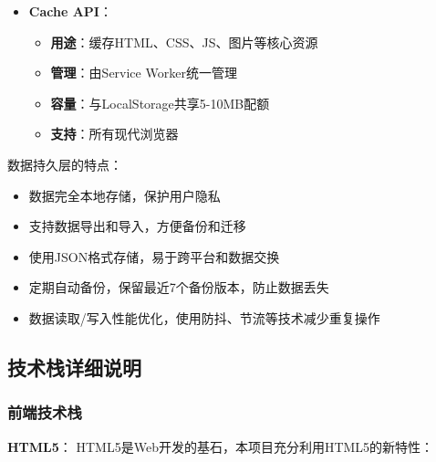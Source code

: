 \documentclass[12pt,a4paper]{article}
\begin{document}
\begin{itemize}
    \item \textbf{Cache API}：
        \begin{itemize}
            \item \textbf{用途}：缓存HTML、CSS、JS、图片等核心资源
            \item \textbf{管理}：由Service Worker统一管理
            \item \textbf{容量}：与LocalStorage共享5-10MB配额
            \item \textbf{支持}：所有现代浏览器
        \end{itemize}
\end{itemize}

数据持久层的特点：
\begin{itemize}
    \item 数据完全本地存储，保护用户隐私
    \item 支持数据导出和导入，方便备份和迁移
    \item 使用JSON格式存储，易于跨平台和数据交换
    \item 定期自动备份，保留最近7个备份版本，防止数据丢失
    \item 数据读取/写入性能优化，使用防抖、节流等技术减少重复操作
\end{itemize}

\subsection{技术栈详细说明}

\subsubsection{前端技术栈}

\textbf{HTML5}：
HTML5是Web开发的基石，本项目充分利用HTML5的新特性：
\end{document}
